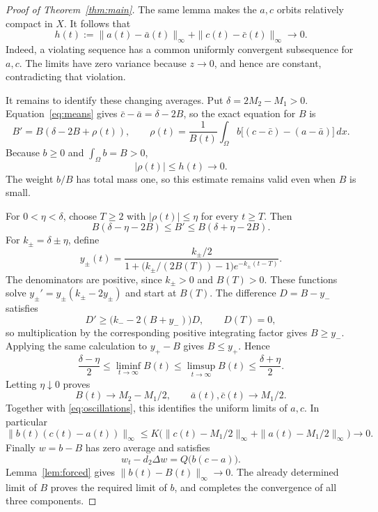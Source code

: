\documentclass[11pt,a4paper]{article}
\begin{document}
\begin{proof}[Proof of Theorem~\ref{thm:main}]
The same lemma makes the \(a,c\) orbits relatively compact in \(X\).
It follows that
\begin{equation}\label{eq:oscillations}
 h(t):=\|a(t)-\bar a(t)\|_\infty+
       \|c(t)-\bar c(t)\|_\infty\longrightarrow0 .
\end{equation}
Indeed, a violating sequence has a common uniformly convergent
subsequence for \(a,c\). The limits have zero variance because
\(z\to0\), and hence are constant, contradicting that violation.

It remains to identify these changing averages. Put
\(\delta=2M_2-M_1>0\). Equation~\eqref{eq:means} gives
\(\bar c-\bar a=\delta-2B\), so the exact equation for \(B\) is
\begin{equation}\label{eq:meanode}
 B'=B(\delta-2B+\rho(t)),\qquad
 \rho(t)=\frac1{B(t)}\int_\Omega
          b\big[(c-\bar c)-(a-\bar a)\big]\,dx .
\end{equation}
Because \(b\ge0\) and \(\int_\Omega b=B>0\),
\begin{equation}\label{eq:rhobound}
 |\rho(t)|\le h(t)\longrightarrow0 .
\end{equation}
The weight \(b/B\) has total mass one, so this estimate remains valid
even when \(B\) is small.

For \(0<\eta<\delta\), choose \(T\ge2\) with
\(|\rho(t)|\le\eta\) for every \(t\ge T\). Then
\[
 B(\delta-\eta-2B)\le B'\le B(\delta+\eta-2B).
\]
For \(k_\pm=\delta\pm\eta\), define
\[
 y_\pm(t)=\frac{k_\pm/2}
 {1+\big(k_\pm/(2B(T))-1\big)e^{-k_\pm(t-T)}} .
\]
The denominators are positive, since \(k_\pm>0\) and \(B(T)>0\).
These functions solve \(y_\pm'=y_\pm(k_\pm-2y_\pm)\) and start at
\(B(T)\). The difference \(D=B-y_-\) satisfies
\[
 D'\ge\big(k_--2(B+y_-)\big)D,\qquad D(T)=0 ,
\]
so multiplication by the corresponding positive integrating factor
gives \(B\ge y_-\). Applying the same calculation to \(y_+-B\)
gives \(B\le y_+\). Hence
\[
 \frac{\delta-\eta}{2}\le\liminf_{t\to\infty}B(t)
 \le\limsup_{t\to\infty}B(t)\le\frac{\delta+\eta}{2}.
\]
Letting \(\eta\downarrow0\) proves
\[
 B(t)\longrightarrow M_2-M_1/2,\qquad
 \bar a(t),\bar c(t)\longrightarrow M_1/2 .
\]
Together with \eqref{eq:oscillations}, this identifies the uniform
limits of \(a,c\). In particular
\[
 \|b(t)(c(t)-a(t))\|_\infty
 \le K\big(\|c(t)-M_1/2\|_\infty+\|a(t)-M_1/2\|_\infty\big)\to0 .
\]
Finally \(w=b-B\) has zero average and satisfies
\[
 w_t-d_2\Delta w=Q\big(b(c-a)\big).
\]
Lemma~\ref{lem:forced} gives \(\|b(t)-B(t)\|_\infty\to0\).
The already determined limit of \(B\) proves the required limit of \(b\),
and completes the convergence of all three components.
\end{proof}
\end{document}
